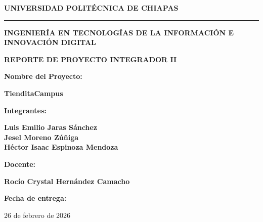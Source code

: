 \documentclass[12pt, a4paper]{article}
\begin{document}
\begin{titlepage}
    \centering
    \vspace*{1cm}
    
    {\Large \textbf{UNIVERSIDAD POLITÉCNICA DE CHIAPAS}}\par
    \vspace{0.5cm}
    \rule{\textwidth}{0.5pt}\par
    \vspace{1cm}
    
    {\large \textbf{INGENIERÍA EN TECNOLOGÍAS DE LA INFORMACIÓN E INNOVACIÓN DIGITAL}}\par
    \vspace{2cm}
    
    {\Large \textbf{REPORTE DE PROYECTO INTEGRADOR II}}\par
    \vspace{1.5cm}
    
    {\large \textbf{Nombre del Proyecto:}}\par
    \vspace{0.3cm}
    {\LARGE \textbf{TienditaCampus}}\par
    \vspace{1.5cm}
    
    {\large \textbf{Integrantes:}}\par
    \vspace{0.3cm}
    {\normalsize 
    \textbf{Luis Emilio Jaras Sánchez} \\
    \textbf{Jesel Moreno Zúñiga} \\
    \textbf{Héctor Isaac Espinoza Mendoza}
    }\par
    \vspace{1.5cm}
    
    {\large \textbf{Docente:}}\par
    \vspace{0.3cm}
    {\normalsize \textbf{Rocío Crystal Hernández Camacho}}\par
    \vspace{1.5cm}
    
    {\large \textbf{Fecha de entrega:}}\par
    \vspace{0.3cm}
    {\normalsize 26 de febrero de 2026}\par
    
    \vfill
\end{titlepage}
\end{document}
